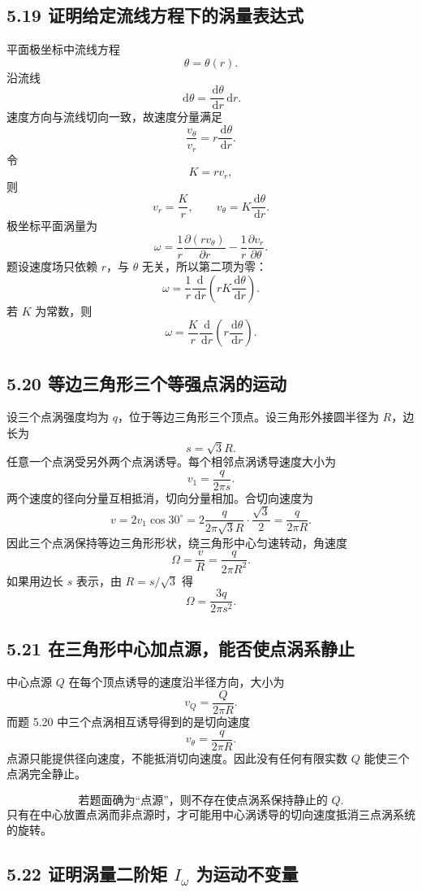 ﻿\documentclass[UTF8,zihao=-4]{ctexart}
\newcommand{\dd}{\,\mathrm d}
\begin{document}
\subsection*{5.19 证明给定流线方程下的涡量表达式}

平面极坐标中流线方程
\[
\theta=\theta(r).
\]
沿流线
\[
\dd\theta=\frac{\dd\theta}{\dd r}\dd r.
\]
速度方向与流线切向一致，故速度分量满足
\[
\frac{v_\theta}{v_r}=r\frac{\dd\theta}{\dd r}.
\]
令
\[
K=rv_r ,
\]
则
\[
v_r=\frac{K}{r},\qquad
v_\theta=K\frac{\dd\theta}{\dd r}.
\]
极坐标平面涡量为
\[
\omega=\frac1r\frac{\partial(rv_\theta)}{\partial r}
-\frac1r\frac{\partial v_r}{\partial\theta}.
\]
题设速度场只依赖 \(r\)，与 \(\theta\) 无关，所以第二项为零：
\[
\omega=\frac1r\frac{\dd}{\dd r}
\left(rK\frac{\dd\theta}{\dd r}\right).
\]
若 \(K\) 为常数，则
\[
\boxed{
\omega=\frac{K}{r}\frac{\dd}{\dd r}
\left(r\frac{\dd\theta}{\dd r}\right).}
\]

\subsection*{5.20 等边三角形三个等强点涡的运动}

设三个点涡强度均为 \(q\)，位于等边三角形三个顶点。设三角形外接圆半径为 \(R\)，边长为
\[
s=\sqrt3R.
\]
任意一个点涡受另外两个点涡诱导。每个相邻点涡诱导速度大小为
\[
v_1=\frac{q}{2\pi s}.
\]
两个速度的径向分量互相抵消，切向分量相加。合切向速度为
\[
v=2v_1\cos30^\circ
=2\frac{q}{2\pi\sqrt3R}\cdot\frac{\sqrt3}{2}
=\frac{q}{2\pi R}.
\]
因此三个点涡保持等边三角形形状，绕三角形中心匀速转动，角速度
\[
\boxed{
\Omega=\frac{v}{R}=\frac{q}{2\pi R^2}.}
\]
如果用边长 \(s\) 表示，由 \(R=s/\sqrt3\) 得
\[
\boxed{\Omega=\frac{3q}{2\pi s^2}.}
\]

\subsection*{5.21 在三角形中心加点源，能否使点涡系静止}

中心点源 \(Q\) 在每个顶点诱导的速度沿半径方向，大小为
\[
v_Q=\frac{Q}{2\pi R}.
\]
而题 5.20 中三个点涡相互诱导得到的是切向速度
\[
v_\theta=\frac{q}{2\pi R}.
\]
点源只能提供径向速度，不能抵消切向速度。因此没有任何有限实数 \(Q\) 能使三个点涡完全静止。

\[
\boxed{\text{若题面确为“点源”，则不存在使点涡系保持静止的 }Q.}
\]
只有在中心放置点涡而非点源时，才可能用中心涡诱导的切向速度抵消三点涡系统的旋转。

\subsection*{5.22 证明涡量二阶矩 \(I_\omega\) 为运动不变量}
\end{document}
